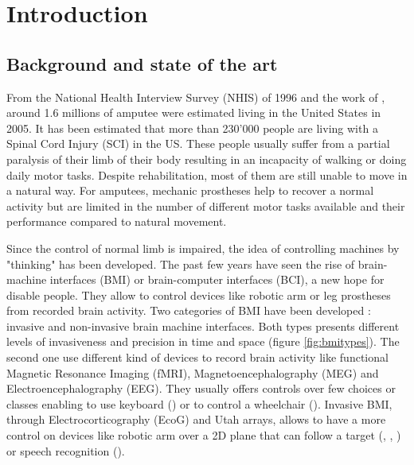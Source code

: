 \documentclass[preprint,12pt]{elsarticle}
\begin{document}
\linenumbers

\section{Introduction}
\label{S:1}
\subsection{Background and state of the art}

From the National Health Interview Survey (NHIS) of 1996 and the work of \citet{Ziegler-Graham2008}, around 1.6 millions of amputee were estimated living in the United States in 2005. It has been estimated that more than 230'000 people are living with a Spinal Cord Injury (SCI) in the US. These people usually suffer from a partial paralysis of their limb of their body resulting in an incapacity of walking or doing daily motor tasks. Despite rehabilitation, most of them are still unable to move in a natural way. For amputees, mechanic prostheses help to recover a normal activity but are limited in the number of different motor tasks available and their performance compared to natural movement.

Since the control of normal limb is impaired, the idea of controlling machines by "thinking" has been developed. The past few years have seen the rise of brain-machine interfaces (BMI) or brain-computer interfaces (BCI), a new hope for disable people. They allow to control devices like robotic arm or leg prostheses from recorded brain activity. Two categories of BMI have been developed : invasive and non-invasive brain machine interfaces. Both types presents different levels of invasiveness and precision in time and space (figure \ref{fig:bmitypes}). The second one use different kind of devices to record brain activity like functional Magnetic Resonance Imaging (fMRI), Magnetoencephalography (MEG) and Electroencephalography (EEG). They usually offers controls over few choices or classes enabling to use keyboard (\citet{Orhan2012}) or to control a wheelchair (\citet{DelRMillan2009}). Invasive BMI, through Electrocorticography (EcoG) and Utah arrays, allows to have a more control on devices like robotic arm over a 2D plane that can follow a target (\citet{Carmena2003}, \citet{Collinger2013}, \citet{Musallam2004}) or speech recognition (\citet{Brumberg2011}). 
\end{document}
